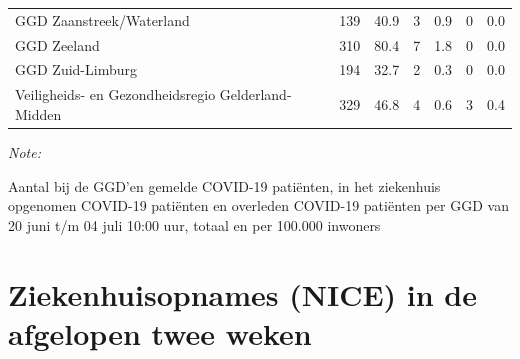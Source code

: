 \documentclass[
  english,
  man,floatsintext]{apa6}
\begin{document}
\begin{table}
\begin{threeparttable}
\begin{tabular}{lrrrrrr}
GGD Zaanstreek/Waterland & 139 & 40.9 & 3 & 0.9 & 0 & 0.0\\
GGD Zeeland & 310 & 80.4 & 7 & 1.8 & 0 & 0.0\\
GGD Zuid-Limburg & 194 & 32.7 & 2 & 0.3 & 0 & 0.0\\
Veiligheids- en Gezondheidsregio Gelderland-Midden & 329 & 46.8 & 4 & 0.6 & 3 & 0.4\\
\bottomrule
\end{tabular}
\begin{tablenotes}
\item \textit{Note: } 
\item Aantal bij de GGD’en gemelde COVID-19 patiënten, in het ziekenhuis opgenomen COVID-19 patiënten en overleden COVID-19 patiënten per GGD van 20 juni t/m 04 juli 10:00 uur, totaal en per 100.000 inwoners
\end{tablenotes}
\end{threeparttable}
\endgroup{}
\end{table}

\newpage

\hypertarget{ziekenhuisopnames-nice-in-de-afgelopen-twee-weken}{%
\section{Ziekenhuisopnames (NICE) in de afgelopen twee weken}\label{ziekenhuisopnames-nice-in-de-afgelopen-twee-weken}}
\end{document}
